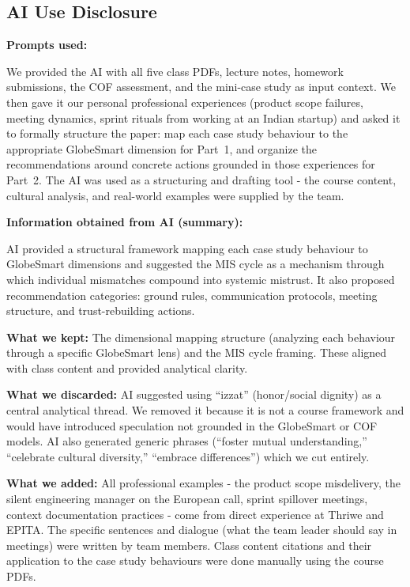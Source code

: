 \documentclass[12pt, a4paper]{article}
\begin{document}
\vspace{3em}

\subsection*{AI Use Disclosure}

\textbf{Prompts used:}

We provided the AI with all five class PDFs, lecture notes, homework submissions, the COF assessment, and the mini-case study as input context. We then gave it our personal professional experiences (product scope failures, meeting dynamics, sprint rituals from working at an Indian startup) and asked it to formally structure the paper: map each case study behaviour to the appropriate GlobeSmart dimension for Part~1, and organize the recommendations around concrete actions grounded in those experiences for Part~2. The AI was used as a structuring and drafting tool - the course content, cultural analysis, and real-world examples were supplied by the team.

\textbf{Information obtained from AI (summary):}

AI provided a structural framework mapping each case study behaviour to GlobeSmart dimensions and suggested the MIS cycle as a mechanism through which individual mismatches compound into systemic mistrust. It also proposed recommendation categories: ground rules, communication protocols, meeting structure, and trust-rebuilding actions.

\textbf{What we kept:} The dimensional mapping structure (analyzing each behaviour through a specific GlobeSmart lens) and the MIS cycle framing. These aligned with class content and provided analytical clarity.

\textbf{What we discarded:} AI suggested using ``izzat'' (honor/social dignity) as a central analytical thread. We removed it because it is not a course framework and would have introduced speculation not grounded in the GlobeSmart or COF models. AI also generated generic phrases (``foster mutual understanding,'' ``celebrate cultural diversity,'' ``embrace differences'') which we cut entirely.

\textbf{What we added:} All professional examples - the product scope misdelivery, the silent engineering manager on the European call, sprint spillover meetings, context documentation practices - come from direct experience at Thriwe and EPITA. The specific sentences and dialogue (what the team leader should say in meetings) were written by team members. Class content citations and their application to the case study behaviours were done manually using the course PDFs.
\end{document}
